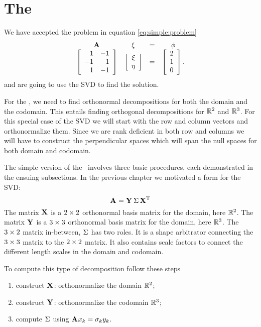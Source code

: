 \section{The \svdl}
\label{sec:svd}

We have accepted the problem in equation \eqref{eq:simple:problem}
\begin{equation*}
\begin{array}{cccc}
    \A{} & \xi & = & \phi\\
    \Aexample &
    \mat{c}{\xi\\ \eta}
    & = &
    \phivector.
\end{array}
\end{equation*}
and are going to use the SVD to find the solution.

For the \svdl, we need to find orthonormal decompositions for both the domain and the codomain. This entails finding orthogonal decompositions for $\real{2}$ and $\real{3}$. For this special case of the SVD we will start with the row and column vectors and orthonormalize them. Since we are rank deficient in both row and columns we will have to construct the perpendicular spaces which will span the null spaces for both domain and codomain.

The simple version of the \svdl \ involves three basic procedures, each demonstrated in the ensuing subsections. In the previous chapter we motivated a form for the SVD:
\begin{equation}
  \svdax{T}
  \label{eq:simple:canon}
\end{equation}
The matrix $\X{}$ is a $\bys{2}$ orthonormal basis matrix for the domain, here $\real{2}$. The matrix $\Y{}$ is a $\bys{3}$ orthonormal basis matrix for the domain, here $\real{3}$. The $\by{3}{2}$ matrix in-between, $\sig{}$ has two roles. It is a shape arbitrator connecting the $\bys{3}$ matrix to the $\bys{2}$ matrix. It also contains scale factors to connect the different length scales in the domain and codomain.

To compute this type of decomposition follow these steps
\begin{enumerate}
\item construct $\X{}$: orthonormalize the domain $\real{2}$;
\item construct $\Y{}$: orthonormalize the codomain $\real{3}$;
\item compute $\sig{}$ using $\A{}x_{k} = \sigma_{k} y_{k}$.
\end{enumerate}

